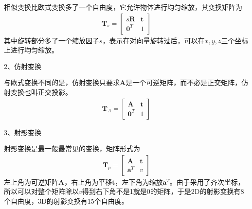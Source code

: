 \documentclass[10pt]{article}
\begin{document}
相似变换比欧式变换多了一个自由度，它允许物体进行均匀缩放，其变换矩阵为
\begin{align}
    \mathbf{T}_{s}=\left[\begin{array}{ll}
        s\mathbf{R} & \mathbf{t} \\
        \mathbf{0}^{T} & 1 \end{array}
        \right]
    \end{align}
其中旋转部分多了一个缩放因子$s$，表示在对向量旋转过后，可以在$x,y,z$三个坐标上进行均匀缩放。

2、仿射变换

与欧式变换不同的是，仿射变换只要求$\mathbf{A}$是一个可逆矩阵，而不必是正交矩阵，仿射变换也叫正交投影。
\begin{align}  
    \mathbf{T}_A=\left[\begin{array}{ll}
        \mathbf{A} & \mathbf{t} \\
        \mathbf{0}^{T} & 1
    \end{array}\right]
\end{align}
    
3、射影变换

射影变换是最一般最常见的变换，矩阵形式为
\begin{align}  
    \mathbf{T}_p=\left[\begin{array}{ll}
        \mathbf{A} & \mathbf{t} \\
        \mathbf{a}^{T} & v
    \end{array}\right]
\end{align}
左上角为可逆矩阵$\mathbf{A}$，右上角为平移$\mathbf{t}$，左下角为缩放$\mathbf{a}^{T}$。由于采用了齐次坐标，
所以可以对整个矩阵除以$v$得到右下角不是1就是0的矩阵，于是2D的射影变换有8个自由度，3D的射影变换有15个自由度。

    


 
\end{document}
